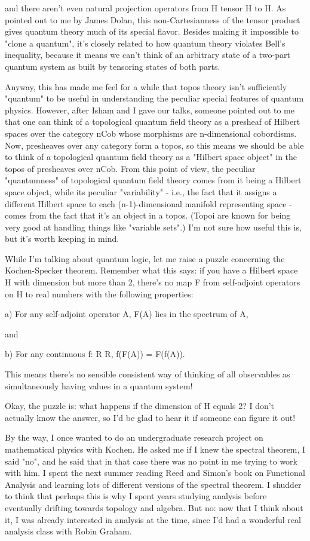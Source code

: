 and there aren't even natural projection operators from H tensor H 
to H.  As pointed out to me by James Dolan, this non-Cartesianness 
of the tensor product gives quantum theory much of its special flavor.  
Besides making it impossible to "clone a quantum", it's closely 
related to how quantum theory violates Bell's inequality, because 
it means we can't think of an arbitrary state of a two-part quantum 
system as built by tensoring states of both parts.  


 Anyway, this has made me feel for a while that topos theory isn't
sufficiently "quantum" to be useful in understanding the
peculiar special features of quantum physics.  However, after Isham and
I gave our talks, someone pointed out to me that one can think of a
topological quantum field theory as a presheaf of Hilbert spaces over
the category nCob whose morphisms are n-dimensional cobordisms.  Now,
presheaves over any category form a topos, so this means we should be
able to think of a topological quantum field theory as a "Hilbert
space object" in the topos of presheaves over nCob.  From this
point of view, the peculiar "quantumness" of topological
quantum field theory comes from it being a Hilbert space object, while
its peculiar "variability" - i.e., the fact that it assigns a
different Hilbert space to each (n-1)-dimensional manifold representing
space - comes from the fact that it's an object in a topos.  (Topoi are
known for being very good at handling things like "variable
sets".)  I'm not sure how useful this is, but it's worth keeping in
mind.

While I'm talking about quantum logic, let me raise a puzzle 
concerning the Kochen-Specker theorem.  Remember what this says:
if you have a Hilbert space H with dimension but more than 2, 
there's no map F from self-adjoint operators on H to real numbers 
with the following properties:

a) For any self-adjoint operator A, F(A) lies in the spectrum of A,

and

b) For any continuous f: R \to  R, f(F(A)) = F(f(A)).

This means there's no sensible consistent way of thinking of all
observables as simultaneously having values in a quantum system!

Okay, the puzzle is: what happens if the dimension of H equals 2?
I don't actually know the answer, so I'd be glad to hear it if
someone can figure it out!

By the way, I once wanted to do an undergraduate research project
on mathematical physics with Kochen.  He asked me if I knew the 
spectral theorem, I said "no", and he said that in that case there
was no point in me trying to work with him.  I spent the next summer
reading Reed and Simon's book on Functional Analysis and learning 
lots of different versions of the spectral theorem.  I shudder to 
think that perhaps this is why I spent years studying analysis
before eventually drifting towards topology and algebra.  But no: 
now that I think about it, I was already interested in analysis at 
the time, since I'd had a wonderful real analysis class with Robin 
Graham.   

